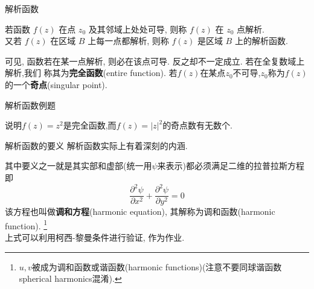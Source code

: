 \documentclass[fontset=windows, chinese, 10pt]{beamer}
\begin{document}
\begin{frame}{解析函数}
\begin{definition}
若函数 $f(z)$ 在点 $z_0$ 及其邻域上处处可导, 则称 $f(z)$ 在 $z_0$ 点解析.\\
 又若 $f(z)$ 在区域 $B$ 上每一点都解析, 则称 $f(z)$ 是区域 $B$ 上的解析函数.
\end{definition} 

 可见, 函数若在某一点解析, 则必在该点可导. 反之却不一定成立. 若在全复数域上解析,我们
 称其为{\bf 完全函数}(entire function).
 若$f(z)$在某点$z_0$不可导,$z_0$称为$f(z)$的一个{\bf 奇点}(singular point).



\end{frame}

\begin{frame}{解析函数例题}
  \begin{example}
说明$f(z)=z^2$是完全函数,而$f(z)=|z|^2$的奇点数有无数个.
\end{example}
\end{frame}

\begin{frame}{解析函数的要义}
解析函数实际上有着深刻的内涵. 

其中要义之一就是其实部和虚部(统一用$\psi$来表示)都必须满足二维的拉普拉斯方程即
 \begin{equation}
    \label{eq:Laplace_eq}
    \frac{\partial^2 \psi}{\partial x^2}+\frac{\partial^2 \psi}{\partial y^2}=0
 \end{equation}
该方程也叫做\textbf{调和方程}(harmonic equation), 其解称为调和函数(harmonic function). 
\footnote{$u,v$被成为调和函数或谐函数(harmonic functions)(注意不要同球谐函数spherical harmonics混淆).}
\\
上式可以利用柯西-黎曼条件进行验证, 作为作业. 

\end{frame}
\end{document}
